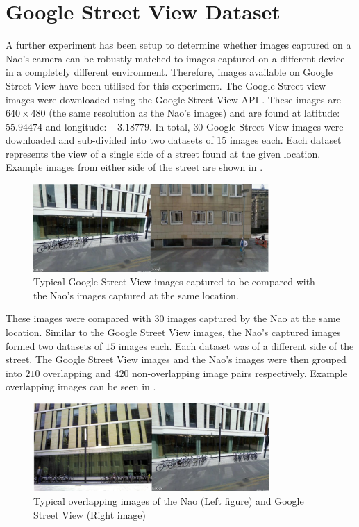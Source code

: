 \documentclass[11pt]{report}
\begin{document}
\section{Google Street View Dataset}
\label{sec:streetView}
A further experiment has been setup to determine whether images captured on a Nao's camera can be robustly matched to images captured on a different device in a completely different environment. Therefore, images available on Google Street View have been utilised for this experiment. The Google Street view images were downloaded using the Google Street View API \cite{StreetView}. These images are $640 \times 480$ (the same resolution as the Nao's images) and are found at latitude: $55.94474$ and longitude: $-3.18779$. In total, $30$ Google Street View images were downloaded and sub-divided into two datasets of $15$ images each. Each dataset represents the view of a single side of a street found at the given location. Example images from either side of the street are shown in .\\

 \begin{figure}[h!] 
  \centering
    \includegraphics[width=0.8\textwidth]{../Drawings/streetView/googleStreetView.jpg}
    \caption{Typical Google Street View images captured to be compared with the Nao's images captured at the same location.}
    \label{fig:googleStreetImages}
\end{figure}

These images were compared with $30$ images captured by the Nao at the same location. Similar to the Google Street View images, the Nao's captured images formed two datasets of $15$ images each. Each dataset was of a different side of the street. The Google Street View images and the Nao's images were then grouped into $210$ overlapping and $420$ non-overlapping image pairs respectively. Example overlapping images can be seen in .\\

 \begin{figure}[h!] 
  \centering
    \includegraphics[width=0.8\textwidth]{../Drawings/streetView/googleOverlapping.jpg}
    \caption{Typical overlapping images of the Nao (Left figure) and Google Street View (Right image)}
    \label{fig:googleStreetImages}
\end{figure}
\end{document}
